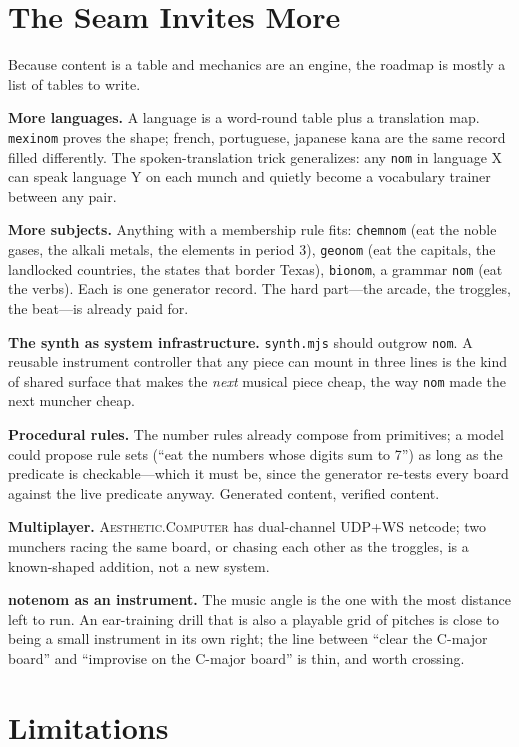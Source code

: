 \documentclass[10pt,letterpaper,twocolumn]{article}
\newcommand{\ac}{\textsc{Aesthetic.Computer}}
\begin{document}
\section{The Seam Invites More}

Because content is a table and mechanics are an engine, the roadmap is mostly a list of tables to write.

\textbf{More languages.} A language is a word-round table plus a translation map. \texttt{mexinom} proves the shape; french, portuguese, japanese kana are the same record filled differently. The spoken-translation trick generalizes: any \texttt{nom} in language X can speak language Y on each munch and quietly become a vocabulary trainer between any pair.

\textbf{More subjects.} Anything with a membership rule fits: \texttt{chemnom} (eat the noble gases, the alkali metals, the elements in period 3), \texttt{geonom} (eat the capitals, the landlocked countries, the states that border Texas), \texttt{bionom}, a grammar \texttt{nom} (eat the verbs). Each is one generator record. The hard part---the arcade, the troggles, the beat---is already paid for.

\textbf{The synth as system infrastructure.} \texttt{synth.mjs} should outgrow \texttt{nom}. A reusable instrument controller that any piece can mount in three lines is the kind of shared surface that makes the \emph{next} musical piece cheap, the way \texttt{nom} made the next muncher cheap.

\textbf{Procedural rules.} The number rules already compose from primitives; a model could propose rule sets (``eat the numbers whose digits sum to 7'') as long as the predicate is checkable---which it must be, since the generator re-tests every board against the live predicate anyway. Generated content, verified content.

\textbf{Multiplayer.} \ac{} has dual-channel UDP+WS netcode; two munchers racing the same board, or chasing each other as the troggles, is a known-shaped addition, not a new system.

\textbf{notenom as an instrument.} The music angle is the one with the most distance left to run. An ear-training drill that is also a playable grid of pitches is close to being a small instrument in its own right; the line between ``clear the C-major board'' and ``improvise on the C-major board'' is thin, and worth crossing.

\section{Limitations}
\end{document}
